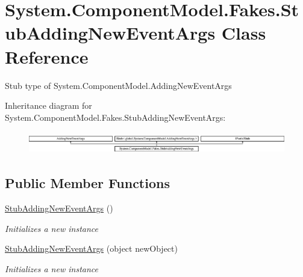 \hypertarget{class_system_1_1_component_model_1_1_fakes_1_1_stub_adding_new_event_args}{\section{System.\-Component\-Model.\-Fakes.\-Stub\-Adding\-New\-Event\-Args Class Reference}
\label{class_system_1_1_component_model_1_1_fakes_1_1_stub_adding_new_event_args}
}


Stub type of System.\-Component\-Model.\-Adding\-New\-Event\-Args 


Inheritance diagram for System.\-Component\-Model.\-Fakes.\-Stub\-Adding\-New\-Event\-Args\-:\begin{figure}[H]
\begin{center}
\leavevmode
\includegraphics[height=0.982456cm]{class_system_1_1_component_model_1_1_fakes_1_1_stub_adding_new_event_args}
\end{center}
\end{figure}
\subsection*{Public Member Functions}
\begin{DoxyCompactItemize}
\item 
\hyperlink{class_system_1_1_component_model_1_1_fakes_1_1_stub_adding_new_event_args_a1d878b17e67ac581bbf50f01beb40a1e}{Stub\-Adding\-New\-Event\-Args} ()
\begin{DoxyCompactList}\small\item\em Initializes a new instance\end{DoxyCompactList}\item 
\hyperlink{class_system_1_1_component_model_1_1_fakes_1_1_stub_adding_new_event_args_ad5212c03fe27da92dd1d870f893cd111}{Stub\-Adding\-New\-Event\-Args} (object new\-Object)
\begin{DoxyCompactList}\small\item\em Initializes a new instance\end{DoxyCompactList}\end{DoxyCompactItemize}
